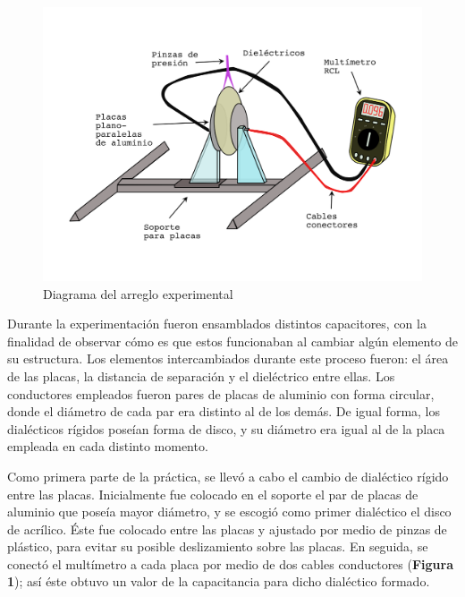 \documentclass[letterpaper, 11 pt]{article}
\begin{document}
\begin{multicols}{2}
\begin{figure}[H]
    \includegraphics[scale=0.20]{Yanomegustaivonne1.png}
    \caption{Diagrama del arreglo experimental}
    \centering
\end{figure}
Durante la experimentación fueron ensamblados distintos capacitores, con la finalidad de observar cómo es que estos funcionaban al cambiar algún elemento de su estructura. Los elementos intercambiados durante este proceso fueron: el área de las placas, la distancia de separación y el dieléctrico entre ellas.
Los conductores empleados fueron pares de placas de aluminio con forma circular, donde el diámetro de cada par era distinto al de los demás. De igual forma, los dialécticos rígidos poseían forma de disco, y su diámetro era igual al de la placa empleada en cada distinto momento.

Como primera parte de la práctica, se llevó a cabo el cambio de dialéctico rígido entre las placas. 
Inicialmente fue colocado en el soporte el par de placas de aluminio que poseía mayor diámetro, y se escogió como primer dialéctico el disco de acrílico. Éste fue colocado entre las placas y ajustado por medio de pinzas de plástico, para evitar su posible deslizamiento sobre las placas. En seguida, se conectó el multímetro a cada placa por medio de dos cables conductores (\textbf{Figura 1}); así éste obtuvo un valor de la capacitancia para dicho dialéctico formado. 



\end{multicols}
\end{document}

